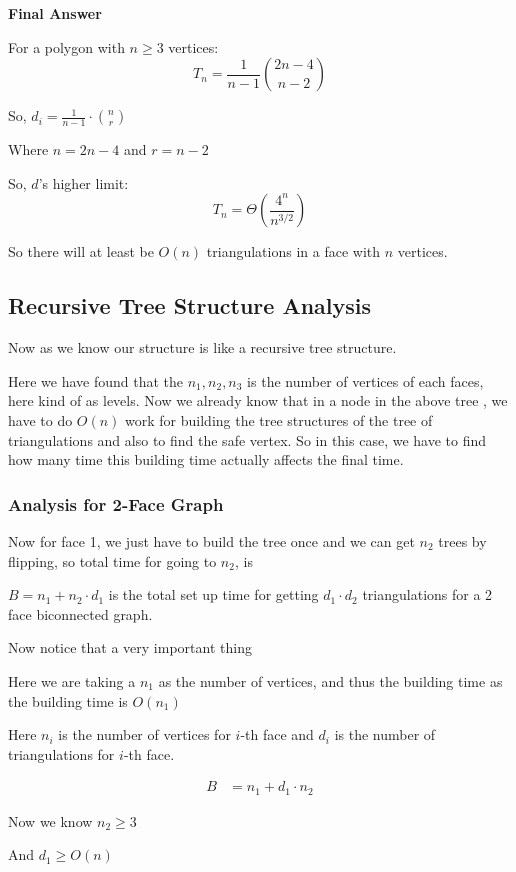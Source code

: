 \documentclass[12pt,a4paper]{article}
\begin{document}
\textbf{Final Answer}

For a polygon with $n \geq 3$ vertices:
\[
\boxed{T_n = \frac{1}{n-1}\binom{2n-4}{n-2}}
\]

So, $d_i = \frac{1}{n-1} \cdot \binom{n}{r}$

Where $n = 2n-4$ and $r = n-2$

So, $d$'s higher limit:
\[
T_n = \Theta\left(\frac{4^n}{n^{3/2}}\right)
\]

So there will at least be $O(n)$ triangulations in a face with $n$ vertices.

\subsection{Recursive Tree Structure Analysis}

Now as we know our structure is like a recursive tree structure.

Here we have found that the $n_1, n_2, n_3$ is the number of vertices of each faces, here kind of as levels. Now we already know that in a node in the above tree , we have to do $O(n)$ work for building the tree structures of the tree of triangulations and also to find the safe vertex. So in this case, we have to find how many time this building time actually affects the final time. 

\subsubsection{Analysis for 2-Face Graph}

Now for face 1, we just have to build the tree once and we can get $n_2$ trees by flipping, so total time for going to $n_2$, is 

$B = n_1 + n_2 \cdot d_1$ is the total set up time for getting $d_1 \cdot d_2$ triangulations for a 2 face biconnected graph.

Now notice that a very important thing 

Here we are taking a $n_1$ as the number of vertices, and thus the building time as the building time is $O(n_1)$ 

Here $n_i$ is the number of vertices for $i$-th face and $d_i$ is the number of triangulations for $i$-th face.

\begin{align*}
B &= n_1 + d_1 \cdot n_2
\end{align*}

Now we know $n_2 \geq 3$

And $d_1 \geq O(n)$
\end{document}
